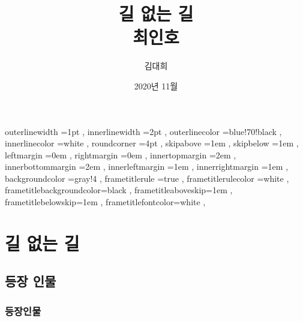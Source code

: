 \documentclass[12pt, a4paper, oneside]{book}
\let\stdsection\section
\renewcommand\section{\newpage\stdsection}
\begin{document}
	
			\dominitoc
			\doparttoc			




			\title{ 길 없는  길 \\ 최인호}
			\author{김대희}
			\date{ 2020년 11월 }
			\maketitle


			\tableofcontents 		%
			\cleardoublepage
			\listoftables 			%





		 {
						outerlinewidth		=1pt			,%
						innerlinewidth		=2pt			,%
						outerlinecolor		=blue!70!black	,%
						innerlinecolor		=white 			,%
						roundcorner			=4pt			,%
						skipabove			=1em 			,%
						skipbelow			=1em 			,%
						leftmargin			=0em			,%
						rightmargin			=0em			,%
						innertopmargin		=2em 			,%
						innerbottommargin 	=2em 			,%
						innerleftmargin		=1em 			,%
						innerrightmargin		=1em 			,%
						backgroundcolor		=gray!4			,%
						frametitlerule		=true 			,%
						frametitlerulecolor	=white			,%
						frametitlebackgroundcolor=black		,%
						frametitleaboveskip=1em 			,%
						frametitlebelowskip=1em 			,%
						frametitlefontcolor=white 			,%
						}



	\part{길 없는 길}
	\noptcrule
	\parttoc				


%										
	\chapter{ 등장 인물}

%										
	\section{ 등장인물 }
\end{document}

